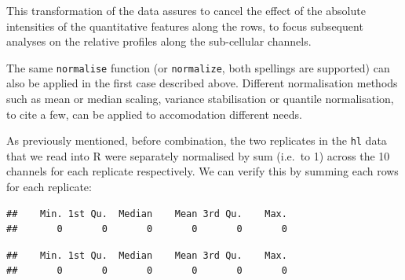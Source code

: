 \begin{Shaded}
\begin{Highlighting}[]
\StringTok{ } \NormalTok{) }
\end{Highlighting}
\end{Shaded}

This transformation of the data assures to cancel the effect of the
absolute intensities of the quantitative features along the rows, to
focus subsequent analyses on the relative profiles along the
sub-cellular channels.

The same \texttt{normalise} function (or \texttt{normalize}, both
spellings are supported) can also be applied in the first case described
above. Different normalisation methods such as mean or median scaling,
variance stabilisation or quantile normalisation, to cite a few, can be
applied to accomodation different needs.

As previously mentioned, before combination, the two replicates in the
\texttt{hl} data that we read into R were separately normalised by sum
(i.e.~to 1) across the 10 channels for each replicate respectively. We
can verify this by summing each rows for each replicate:

\begin{Shaded}
\begin{Highlighting}[]
\NormalTok{(}\NormalTok{(}\NormalTok{(hl[, hl$replicate ==}\StringTok{ }\NormalTok{])))}
\end{Highlighting}
\end{Shaded}

\begin{verbatim}
##    Min. 1st Qu.  Median    Mean 3rd Qu.    Max. 
##       0       0       0       0       0       0
\end{verbatim}

\begin{Shaded}
\begin{Highlighting}[]
\NormalTok{(}\NormalTok{(}\NormalTok{(hl[, hl$replicate ==}\StringTok{ }\NormalTok{])))}
\end{Highlighting}
\end{Shaded}

\begin{verbatim}
##    Min. 1st Qu.  Median    Mean 3rd Qu.    Max. 
##       0       0       0       0       0       0
\end{verbatim}

